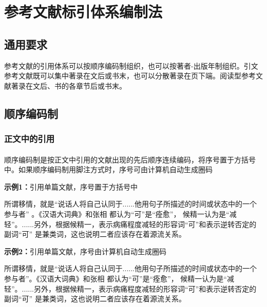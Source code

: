 \documentclass{article}
\begin{document}
\newpage
\appendix


\section{参考文献标引体系编制法}

\subsection{通用要求}

参考文献的引用体系可以按顺序编码制组织，也可以按著者-出版年制组织。引文参考文献既可以集中著录在文后或书末，也可以分散著录在页下端。阅读型参考文献著录在文后、书的各章节后或书末。

\subsection{顺序编码制}

\subsubsection{正文中的引用}

\paragraph{} 顺序编码制是按正文中引用的文献出现的先后顺序连续编码，将序号置于方括号中。如果顺序编码制用脚注方式时，序号可由计算机自动生成圈码



\begin{refsection}
\textbf{示例1：}引用单篇文献，序号置于方括号中

所谓移情，就是“说话人将自己认同于......他用句子所描述的时间或状态中的一个参与者”
\cite{Sunstein1996-903-903}。《汉语大词典》和张相
\cite{Morri2010--}都认为“可”是“痊愈”，
候精一认为是“减轻”\cite{罗杰斯2011-15-16}。......另外，根据候精一，表示病痛程度减轻的形容词“可”和表示逆转否定的副词“可”
是兼类词\cite{陈登原2000-29-29}，这也说明二者应该存在着源流关系。

\textbf{示例2：}引用单篇文献，序号由计算机自动生成圈码

所谓移情，就是“说话人将自己认同于......他用句子所描述的时间或状态中的一个参与者”。《汉语大词典》和张相
都认为“可”是“痊愈”，
候精一认为是“减轻”。......另外，根据候精一，表示病痛程度减轻的形容词“可”和表示逆转否定的副词“可”
是兼类词，这也说明二者应该存在着源流关系。


\end{refsection}
\end{document}
